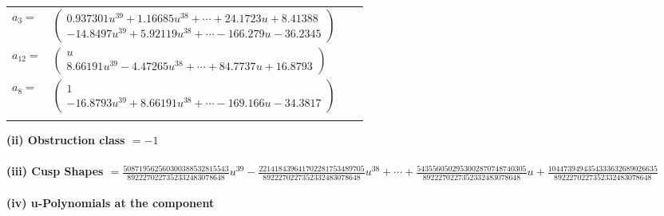 \documentclass[1p]{elsarticle_modified}
\theoremstyle{definition}
\begin{document}
\begin{tabular}{m{7pt} m{180pt} m{7pt} m{180pt} }
\flushright $a_{3}=$&$\begin{pmatrix}0.937301 u^{39}+1.16685 u^{38}+\cdots+24.1723 u+8.41388\\-14.8497 u^{39}+5.92119 u^{38}+\cdots-166.279 u-36.2345\end{pmatrix}$ \\
\flushright $a_{12}=$&$\begin{pmatrix}u\\8.66191 u^{39}-4.47265 u^{38}+\cdots+84.7737 u+16.8793\end{pmatrix}$ \\
\flushright $a_{8}=$&$\begin{pmatrix}1\\-16.8793 u^{39}+8.66191 u^{38}+\cdots-169.166 u-34.3817\end{pmatrix}$\\&\end{tabular}
\flushleft \textbf{(ii) Obstruction class $= -1$}\\~\\
\flushleft \textbf{(iii) Cusp Shapes $= \frac{508719562560300388532815543}{8922270227352332483078648} u^{39}-\frac{221418439641702281753489705}{8922270227352332483078648} u^{38}+\cdots+\frac{5435560502953002870748740305}{8922270227352332483078648} u+\frac{1044739494354333632689026635}{8922270227352332483078648}$}\\~\\
\newpage\renewcommand{\arraystretch}{1}
\flushleft \textbf{(iv) u-Polynomials at the component}\newline \\
\end{document}
